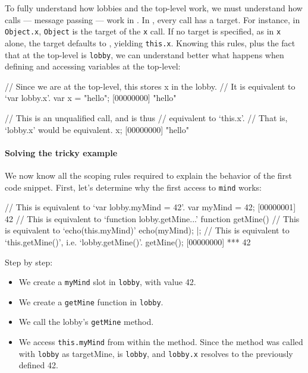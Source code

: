 To fully understand how lobbies and the top-level work, we must
understand how calls --- message passing --- work in \us.  In \us,
every call has a target. For instance, in \lstinline|Object.x|,
\lstinline|Object| is the target of the \lstinline|x| call. If no
target is specified, as in \lstinline|x| alone, the target defaults to
\this, yielding \lstinline|this.x|. Knowing this rules,
plus the fact that at the top-level \this is
\lstinline|lobby|, we can understand better what happens when defining
and accessing variables at the top-level:

\begin{urbiscript}
// Since we are at the top-level, this stores x in the lobby.
// It is equivalent to `var lobby.x'.
var x = "hello";
[00000000] "hello"

// This is an unqualified call, and is thus
// equivalent to `this.x'.
// That is, `lobby.x' would be equivalent.
x;
[00000000] "hello"
\end{urbiscript}

\paragraph{Solving the tricky example}
We now know all the scoping rules required to explain the behavior of
the first code snippet. First, let's determine why the first access to
\lstinline|mind| works:

\begin{urbiscript}
// This is equivalent to `var lobby.myMind = 42'.
var myMind = 42;
[00000001] 42
// This is equivalent to `function lobby.getMine...'
function getMine()
{
  // This is equivalent to `echo(this.myMind)'
  echo(myMind);
}|;
// This is equivalent to `this.getMine()', i.e. `lobby.getMine()'.
getMine();
[00000000] *** 42
\end{urbiscript}

Step by step:
\begin{itemize}
\item We create a \lstinline|myMind| slot in \lstinline|lobby|, with
  value 42.
\item We create a \lstinline|getMine| function in \lstinline|lobby|.
\item We call the lobby's \lstinline|getMine| method.
\item We access \lstinline|this.myMind| from within the method. Since
  the method was called with \lstinline|lobby| as targetMine,
  \this is \lstinline|lobby|, and \lstinline|lobby.x|
  resolves to the previously defined 42.
\end{itemize}

